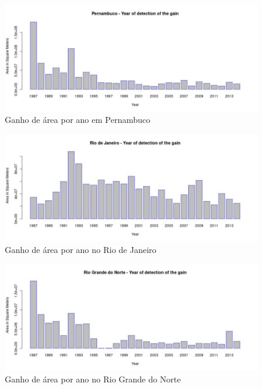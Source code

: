 \begin{figure}[H]
    \centering
    \includegraphics[scale=.5]{images/gain_graphics/Pernambuco_gain.pdf}
    \caption{Ganho de área por ano em Pernambuco}
    \label{fig:gain_pernambuco}
\end{figure}

\begin{figure}[H]
    \centering
    \includegraphics[scale=.5]{images/gain_graphics/Rio de Janeiro_gain.pdf}
    \caption{Ganho de área por ano no Rio de Janeiro}
    \label{fig:gain_rio_de_janeiro}
\end{figure}

\begin{figure}[H]
    \centering
    \includegraphics[scale=.5]{images/gain_graphics/Rio Grande do Norte_gain.pdf}
    \caption{Ganho de área por ano no Rio Grande do Norte}
    \label{fig:gain_rio_grande_do_norte}
\end{figure}

